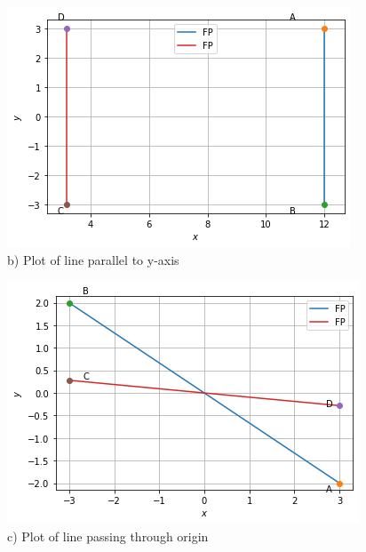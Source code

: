 \documentclass[journal,12pt,twocolumn]{IEEEtran}
\begin{document}
\begin{figure}[!h]
         \centering
         \includegraphics[width=\columnwidth]{parallel to y axis.png}
         \caption{b) Plot of line parallel to y-axis}
         \label{Figure}
\end{figure}
\begin{figure}[!h]
         \centering
         \includegraphics[width=\columnwidth]{passing through origin (1).png}
         \caption{c) Plot of line passing through origin}
         \label{Figure}
\end{figure}
\end{document}
